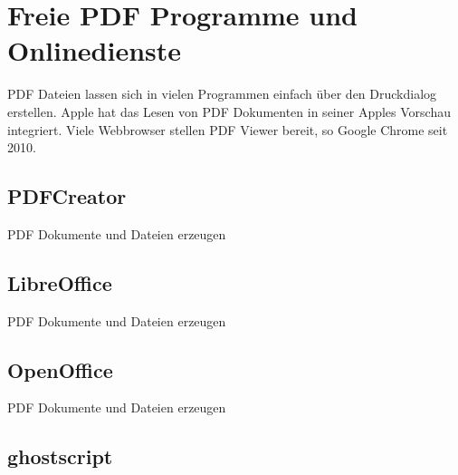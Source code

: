 \section{Freie PDF Programme und Onlinedienste}
PDF Dateien lassen sich in vielen Programmen einfach über den Druckdialog erstellen. Apple hat das Lesen von PDF Dokumenten in seiner Apples Vorschau integriert. Viele Webbrowser stellen PDF Viewer bereit, so Google Chrome seit 2010. \cite{wiki-pdf-de}

\subsection{PDFCreator}
PDF Dokumente und Dateien erzeugen

\subsection{LibreOffice}
PDF Dokumente und Dateien erzeugen

\subsection{OpenOffice}
PDF Dokumente und Dateien erzeugen

\subsection{ghostscript}

